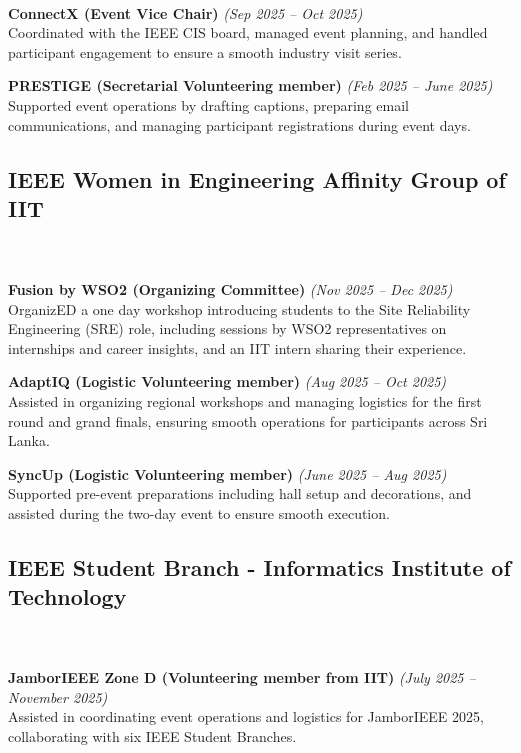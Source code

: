 \documentclass[a4paper,10pt]{article}
\begin{document}
\textit\\
\textbf{ConnectX (Event Vice Chair)} \hfill \textit{(Sep 2025 – Oct 2025)}
\textit\\
Coordinated with the IEEE CIS board, managed event planning, and handled participant engagement to ensure a smooth industry visit series.

\textbf{PRESTIGE (Secretarial Volunteering member)} \hfill \textit{(Feb 2025 – June 2025)}
\textit\\
Supported event operations by drafting captions, preparing email communications, and managing participant registrations during event days.

\subsection*{IEEE Women in Engineering Affinity Group of IIT}\\
\textit\\
\textbf{Fusion by WSO2 (Organizing Committee)} \hfill \textit{(Nov 2025 – Dec 2025)}
\textit\\
OrganizED a one day workshop introducing students to the Site Reliability Engineering (SRE) role, including sessions by WSO2 representatives on internships and career insights, and an IIT intern sharing their experience.

\textbf{AdaptIQ (Logistic Volunteering member)} \hfill \textit{(Aug 2025 – Oct 2025)}
\textit\\
Assisted in organizing regional workshops and managing logistics for the first round and grand finals, ensuring smooth operations for participants across Sri Lanka.

\textbf{SyncUp (Logistic Volunteering member)} \hfill \textit{(June 2025 – Aug 2025)}
\textit\\
Supported pre-event preparations including hall setup and decorations, and assisted during the two-day event to ensure smooth execution.

\subsection*{IEEE Student Branch - Informatics Institute of Technology}\\

\textit\\
\textbf{JamborIEEE Zone D (Volunteering member from IIT)} \hfill \textit{(July 2025 – November 2025)}
\textit\\
Assisted in coordinating event operations and logistics for JamborIEEE 2025, collaborating with six IEEE Student Branches.
\end{document}
